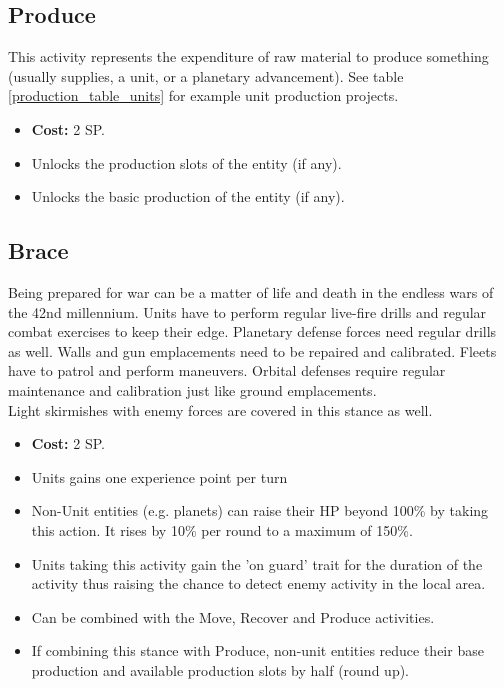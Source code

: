 \subsection{Produce}\label{produce_stance}
This activity represents the expenditure of raw material to produce something (usually supplies, a unit, or a planetary advancement). See table \ref{production_table_units} for example unit production projects.	
\begin{itemize}
	\item \textbf{Cost:} 2 SP.
	\item Unlocks the production slots of the entity (if any).
	\item Unlocks the basic production of the entity (if any).
\end{itemize}

\subsection{Brace}\label{brace_stance}
Being prepared for war can be a matter of life and death in the endless wars of the 42nd millennium. Units have to perform regular live-fire drills and regular combat exercises to keep their edge. Planetary defense forces need regular drills as well. Walls and gun emplacements need to be repaired and calibrated. Fleets have to patrol and perform maneuvers. Orbital defenses require regular maintenance and calibration just like ground emplacements.\\
Light skirmishes with enemy forces are covered in this stance as well.
\begin{itemize}
		\item \textbf{Cost:} 2 SP.
		\item Units gains one experience point per turn
		\item Non-Unit entities (e.g. planets) can raise their HP beyond 100\% by taking this action. It rises by 10\% per round to a maximum of 150\%.
		\item Units taking this activity gain the 'on guard' trait for the duration of the activity thus raising the chance to detect enemy activity in the local area.
		\item Can be combined with the Move, Recover and Produce activities. 
		\item If combining this stance with Produce, non-unit entities reduce their base production and available production slots by half (round up).
\end{itemize}

